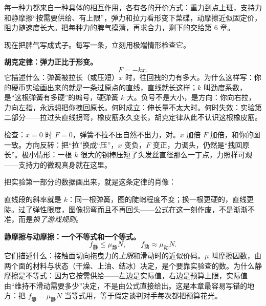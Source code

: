 
\begin{oneline}
每一种力都来自一种具体的相互作用，各有各的开价方式：重力到点上班，支持力和静摩擦“按需要供给、有上限”，弹力和拉力看形变下菜碟，动摩擦近似固定价，阻力随速度长大。把每种力的脾气摸清，再求合力，剩下的交给第 6 章。
\end{oneline}


现在把脾气写成式子。每写一条，立刻用极端情形检查它。

\textbf{胡克定律：弹力正比于形变。}
\[
F=-kx .
\]
它描述什么：弹簧被拉长（或压短）\(x\) 时，往回拽的力有多大。为什么这样写：你的硬币实验画出来的就是一条过原点的直线，直线就长这样；\(k\) 叫劲度系数，是“这根弹簧有多硬”的编号，硬弹簧 \(k\) 大。负号不是大小，是方向：你向右拉，力向左指，永远想把你拽回原长。何时成立：伸长量不太大时。何时失效：实验第二部分——拉过头直线拐弯，橡皮筋永久变长，胡克定律从此不认识这根橡皮筋。

检查：\(x=0\) 时 \(F=0\)，弹簧不拉不压自然不出力，对。\(x\) 加倍 \(F\) 加倍，和你的图一致。方向反转：把“拉”换成“压”，\(x\) 变负，\(F\) 变正，力调头，仍然是“拽回原长”。极小情形：一根 \(k\) 很大的钢棒压短了头发丝直径那么一丁点，力照样可观——支持力的微观真身就在这里。

把实验第一部分的数据画出来，就是这条定律的肖像：

\begin{center}
\end{center}

直线段的斜率就是 \(k\)：同一根弹簧，图的陡峭程度不变；换一根更硬的，直线更陡。过了弹性限度，图像拐弯而且不再回头——公式在这一刻作废，不是渐渐不准，而是\emph{换了游戏规则}。

\textbf{静摩擦与动摩擦：一个不等式和一个等式。}
\[
f_{\text{静}}\le \mu_{\text{静}} N,\qquad f_{\text{动}}\approx \mu_{\text{动}} N .
\]
它们描述什么：接触面切向拖曳力的\emph{上限}和滑动时的近似价码。\(\mu\) 叫摩擦因数，由两个面的材料与状态（干燥、上油、结冰）决定，是个要靠实验查的数。为什么静摩擦是不等式：因为它按需供给——左边是实际值，右边是预算上限，实际值由“维持不滑动需要多少”决定，不是由公式直接给出。这是本章最容易写错的地方：把 \(f_{\text{静}}=\mu_{\text{静}}N\) 当等式用，等于假定谈判对手每次都把预算花光。

